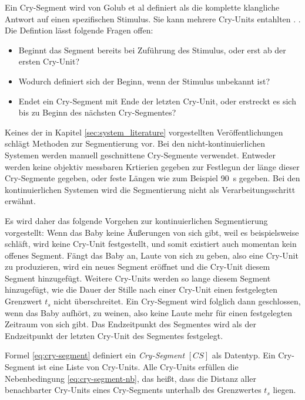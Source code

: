 Ein Cry-Segment wird von Golub et al definiert als \glqq die komplette klangliche Antwort auf einen spezifischen Stimulus. Sie kann mehrere Cry-Units entahlten \grqq. \cite[S. 61, übersetzt aus dem Englischen]{cryModel}. Die Defintion lässt folgende Fragen offen:

\begin{itemize}[leftmargin=*]
	\item Beginnt das Segment bereits bei Zuführung des Stimulus, oder erst ab der ersten Cry-Unit? 
	\item Wodurch definiert sich der Beginn, wenn der Stimulus unbekannt ist?
	\item Endet ein Cry-Segment mit Ende der letzten \glqq Cry-Unit\grqq{}, oder erstreckt es sich bis zu Beginn des nächsten Cry-Segmentes?
\end{itemize}

Keines der in Kapitel \ref{sec:system_literature} vorgestellten Veröffentlichungen schlägt Methoden zur Segmentierung vor. Bei den nicht-kontinuierlichen Systemen werden manuell geschnittene Cry-Segmente verwendet. Entweder werden keine objektiv messbaren Krtierien gegeben zur Festlegun der länge dieser Cry-Segmente gegeben, oder feste Längen wie zum Beispiel \SI{90}{\second}\cite[S. 324]{rythmic} gegeben. Bei den kontinuierlichen Systemen wird die Segmentierung nicht als Verarbeitungsschritt erwähnt.

Es wird daher das folgende Vorgehen zur kontinuierlichen Segmentierung vorgestellt: Wenn das Baby keine Äußerungen von sich gibt, weil es beispielsweise schläft, wird keine Cry-Unit festgestellt, und somit existiert auch momentan kein offenes Segment. Fängt das Baby an, Laute von sich zu geben, also eine Cry-Unit zu produzieren, wird ein neues Segment eröffnet und die Cry-Unit diesem Segment hinzugefügt. Weitere Cry-Units werden so lange diesem Segment hinzugefügt, wie die Dauer der Stille nach einer Cry-Unit einen festgelegten Grenzwert $t_{s}$ nicht überschreitet. Ein Cry-Segment wird folglich dann geschlossen, wenn das Baby \glqq aufhört, zu weinen\grqq{}, also keine Laute mehr für einen festgelegten Zeitraum von sich gibt. Das Endzeitpunkt des Segmentes wird als der Endzeitpunkt der letzten Cry-Unit des Segmentes festgelegt. 

Formel \ref{eq:cry-segment}  definiert ein \emph{Cry-Segment} $[CS]$ als Datentyp. Ein Cry-Segment ist eine Liste von Cry-Units. Alle Cry-Units erfüllen die Nebenbedingung \ref{eq:cry-segment-nb}, das heißt, dass die Distanz aller benachbarter Cry-Units eines Cry-Segments unterhalb des Grenzwertes $t_{s}$ liegen.

